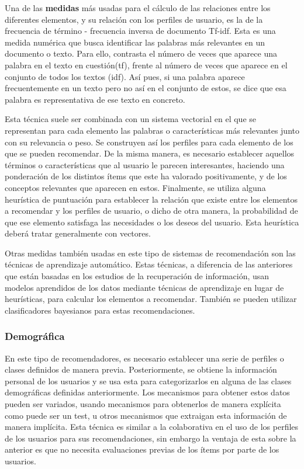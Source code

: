 
Una de las \textbf{medidas} más usadas para el cálculo de las relaciones entre los diferentes elementos, y su relación con los perfiles de usuario, es la de la frecuencia de término - frecuencia inversa de documento \acs{Tf-idf}\cite{robertson2004understanding}. Esta es una medida numérica que busca identificar las palabras más relevantes en un documento o texto. Para ello, contrasta el número de veces que aparece una palabra en el texto en cuestión(tf), frente al número de veces que aparece en el conjunto de todos los textos (idf). Así pues, si una palabra aparece frecuentemente en un texto pero no así en el conjunto de estos, se dice que esa palabra es representativa de ese texto en concreto. 

Esta técnica suele ser combinada con un sistema vectorial\cite{Salton:1975:VSM:361219.361220} en el que se representan para cada elemento las palabras o características más relevantes junto con su relevancia o peso. Se construyen así los perfiles para cada elemento de los que se pueden recomendar. De la misma manera, es necesario establecer aquellos términos o características que al usuario le parecen interesantes, haciendo una ponderación de los distintos ítems que este ha valorado positivamente, y de los conceptos relevantes que aparecen en estos. Finalmente, se utiliza alguna heurística de puntuación para establecer la relación que existe entre los elementos a recomendar y los perfiles de usuario, o dicho de otra manera, la probabilidad de que ese elemento satisfaga las necesidades o los deseos del usuario. Esta heurística deberá tratar generalmente con vectores.

Otras medidas también usadas en este tipo de sistemas de recomendación son las técnicas de aprendizaje automático\cite{lang1995newsweeder}. Estas técnicas, a diferencia de las anteriores que están basadas en los estudios de la recuperación de información, usan modelos aprendidos de los datos mediante técnicas de aprendizaje en lugar de heurísticas, para calcular los elementos a recomendar. También se pueden utilizar clasificadores bayesianos para estas recomendaciones\cite{Pazzani:1997:LRU:261092.261098}.


\subsubsection{Demográfica}
En este tipo de recomendadores, es necesario establecer una serie de perfiles o clases definidos de manera previa. Posteriormente, se obtiene la información personal de los usuarios y se usa esta para categorizarlos en alguna de las clases demográficas definidas anteriormente. Los mecanismos para obtener estos datos pueden ser variados, usando mecanismos para obtenerlos de manera explícita como puede ser un test, u otros mecanismos que extraigan esta información de manera implícita. Esta técnica es similar a la colaborativa en el uso de los perfiles de los usuarios para sus recomendaciones, sin embargo la ventaja de esta sobre la anterior es que no necesita evaluaciones previas de los ítems por parte de los usuarios.



